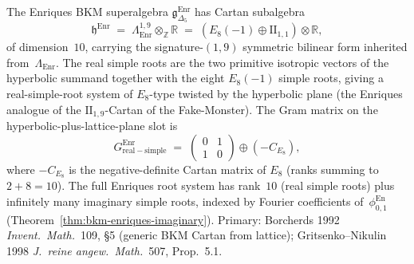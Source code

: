 \begin{theorem}
\label{thm:bkm-enriques-cartan}
The Enriques BKM superalgebra $\mathfrak{g}_{\Delta_5}^{\mathrm{Enr}}$
has Cartan subalgebra
\[
 \mathfrak{h}^{\mathrm{Enr}}
 \;=\;
 \Lambda^{1,9}_{\mathrm{Enr}}\otimes_{\mathbb{Z}}\mathbb{R}
 \;=\;
 (E_8(-1)\oplus\mathrm{II}_{1,1})\otimes\mathbb{R},
\]
of dimension~$10$, carrying the signature-$(1,9)$ symmetric
bilinear form inherited from~$\Lambda_{\mathrm{Enr}}$. The real
simple roots are the two primitive isotropic vectors of the
hyperbolic summand together with the eight $E_8(-1)$ simple roots,
giving a real-simple-root system of
$E_8$-type twisted by the hyperbolic plane (the Enriques analogue
of the $\mathrm{II}_{1,9}$-Cartan of the
Fake-Monster). The Gram matrix on the
hyperbolic-plus-lattice-plane slot is
\[
 G^{\mathrm{Enr}}_{\mathrm{real-simple}}
 \;=\;
 \begin{pmatrix}
 0 & 1 \\
 1 & 0
 \end{pmatrix}
 \oplus
 (-C_{E_8}),
\]
where $-C_{E_8}$ is the negative-definite Cartan matrix of
$E_8$ (ranks summing to $2+8 = 10$). The full Enriques
root system has rank~$10$ (real simple roots) plus infinitely
many imaginary simple roots, indexed by Fourier coefficients
of~$\phi^{\mathrm{En}}_{0,1}$ (Theorem~\ref{thm:bkm-enriques-imaginary}).
Primary: Borcherds 1992 \emph{Invent.~Math.}~109, \S 5
(generic BKM Cartan from lattice);
Gritsenko--Nikulin 1998 \emph{J.~reine angew.~Math.}~507, Prop.~5.1.
\end{theorem}

